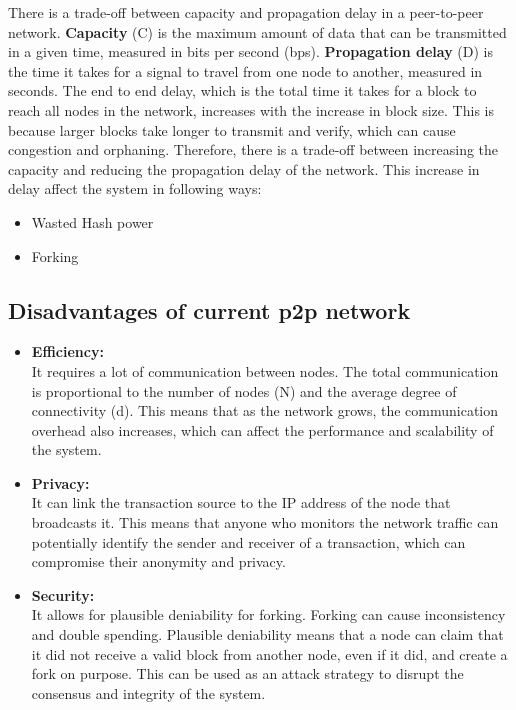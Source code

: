 \documentclass{report}
\begin{document}
There is a trade-off between capacity and propagation delay in a peer-to-peer network. \textbf{Capacity} (C) is the maximum amount of data that can be transmitted in a given time, measured in bits per second (bps). \textbf{Propagation delay} (D) is the time it takes for a signal to travel from one node to another, measured in seconds. The end to end delay, which is the total time it takes for a block to reach all nodes in the network, increases with the increase in block size. This is because larger blocks take longer to transmit and verify, which can cause congestion and orphaning. Therefore, there is a trade-off between increasing the capacity and reducing the propagation delay of the network. This increase in delay affect the system in following ways:
\begin{itemize}
	\item Wasted Hash power
	\item Forking
\end{itemize}
\subsection{Disadvantages of current p2p network}
\begin{itemize}
	\item \textbf{Efficiency:} \\ It requires a lot of communication between nodes. The total communication is proportional to the number of nodes (N) and the average degree of connectivity (d). This means that as the network grows, the communication overhead also increases, which can affect the performance and scalability of the system.
	\item \textbf{Privacy:} \\ It can link the transaction source to the IP address of the node that broadcasts it. This means that anyone who monitors the network traffic can potentially identify the sender and receiver of a transaction, which can compromise their anonymity and privacy.
	\item \textbf{Security:} \\ It allows for plausible deniability for forking. Forking can cause inconsistency and double spending. Plausible deniability means that a node can claim that it did not receive a valid block from another node, even if it did, and create a fork on purpose. This can be used as an attack strategy to disrupt the consensus and integrity of the system.
\end{itemize}
\end{document}
